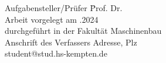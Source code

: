\parbox{120mm}{
\begin{tabbing}
Aufgabensteller/Prüfer \hspace{.7cm} \= Prof. Dr.\\
Arbeit vorgelegt am                  .2024 \\
durchgeführt in der                  \> Fakultät Maschinenbau\\[4mm]
Anschrift des Verfassers          \> Adresse, Plz  \\
                                    \> student@stud.hs-kempten.de \\
\end{tabbing}
}

